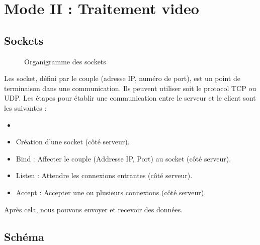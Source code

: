 {
\section{Mode II : Traitement video}\thispagestyle{fancy}


\subsection{Sockets}
\begin{figure}
\centering
{}
\caption{Organigramme des sockets}
\label{fig:figure3}
\end{figure} 
Les socket, défini par le couple (adresse IP, numéro de port), est un point de terminaison dans une communication. Ils peuvent utiliser soit le protocol TCP ou UDP. Les étapes pour établir une communication entre le serveur et le client sont les suivantes :

\begin{itemize}
    \item 
    \item Création d'une socket (côté serveur).
    \item Bind : Affecter le couple (Addresse IP, Port) au socket (côté serveur).
    \item Listen : Attendre les connexions entrantes (côté serveur).
    \item Accept : Accepter une ou plusieurs connexions (côté serveur).
\end{itemize}

Après cela, nous pouvons envoyer et recevoir des données.



\subsection{Schéma}

}
